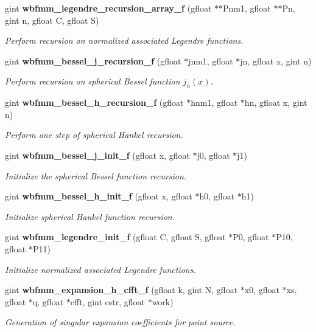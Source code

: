 \begin{DoxyCompactItemize}
gint \textbf{ wbfmm\+\_\+legendre\+\_\+recursion\+\_\+array\+\_\+f} (gfloat $\ast$$\ast$Pnm1, gfloat $\ast$$\ast$Pn, gint n, gfloat C, gfloat S)
\begin{DoxyCompactList}\small\item\em Perform recursion on normalized associated Legendre functions. \end{DoxyCompactList}\item 
gint \textbf{ wbfmm\+\_\+bessel\+\_\+j\+\_\+recursion\+\_\+f} (gfloat $\ast$jnm1, gfloat $\ast$jn, gfloat x, gint n)
\begin{DoxyCompactList}\small\item\em Perform recursion on spherical Bessel function $j_{n}(x)$. \end{DoxyCompactList}\item 
gint \textbf{ wbfmm\+\_\+bessel\+\_\+h\+\_\+recursion\+\_\+f} (gfloat $\ast$hnm1, gfloat $\ast$hn, gfloat x, gint n)
\begin{DoxyCompactList}\small\item\em Perform one step of spherical Hankel recursion. \end{DoxyCompactList}\item 
gint \textbf{ wbfmm\+\_\+bessel\+\_\+j\+\_\+init\+\_\+f} (gfloat x, gfloat $\ast$j0, gfloat $\ast$j1)
\begin{DoxyCompactList}\small\item\em Initialize the spherical Bessel function recursion. \end{DoxyCompactList}\item 
gint \textbf{ wbfmm\+\_\+bessel\+\_\+h\+\_\+init\+\_\+f} (gfloat x, gfloat $\ast$h0, gfloat $\ast$h1)
\begin{DoxyCompactList}\small\item\em Initialize spherical Hankel function recursion. \end{DoxyCompactList}\item 
gint \textbf{ wbfmm\+\_\+legendre\+\_\+init\+\_\+f} (gfloat C, gfloat S, gfloat $\ast$P0, gfloat $\ast$P10, gfloat $\ast$P11)
\begin{DoxyCompactList}\small\item\em Initialize normalized associated Legendre functions. \end{DoxyCompactList}\item 
gint \textbf{ wbfmm\+\_\+expansion\+\_\+h\+\_\+cfft\+\_\+f} (gfloat k, gint N, gfloat $\ast$x0, gfloat $\ast$xs, gfloat $\ast$q, gfloat $\ast$cfft, gint cstr, gfloat $\ast$work)
\begin{DoxyCompactList}\small\item\em Generation of singular expansion coefficients for point source. \end{DoxyCompactList}\item 

\end{DoxyCompactItemize}
